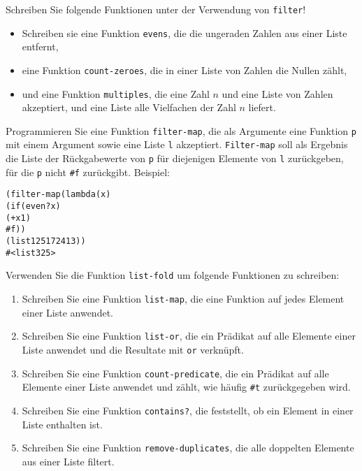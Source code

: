 \begin{aufgabe}
  Schreiben Sie folgende Funktionen unter der  
  Verwendung von \texttt{filter}!
  \begin{itemize}
    \item Schreiben sie eine Funktion \texttt{evens}, die die ungeraden Zahlen aus 
      einer Liste entfernt,
  \item eine Funktion \texttt{count-zeroes}, die in einer Liste von
    Zahlen die Nullen zählt,
  \item und eine Funktion \texttt{multiples}, die eine Zahl $n$ und
    eine Liste von Zahlen akzeptiert, und eine Liste alle Vielfachen
    der Zahl $n$ liefert.
  \end{itemize}
\end{aufgabe}

\begin{aufgabe}
  Programmieren Sie eine Funktion
  \texttt{filter-map}, die als Argumente eine Funktion \texttt{p} mit
  einem Argument sowie eine Liste \texttt{l} akzeptiert.
  \texttt{Filter-map} soll als Ergebnis die Liste der Rückgabewerte
  von \texttt{p} für diejenigen Elemente von \texttt{l} zurückgeben,
  für die \texttt{p} nicht \texttt{\#f} zurückgibt. Beispiel:

\begin{alltt}
(filter-map (lambda (x)
               (if (even? x)
                  (+ x 1)
                  #f))
            (list 1 2 5 17 24 13))
\evalsto{} #<list 3 25>
\end{alltt}
\end{aufgabe}

\begin{aufgabe}
  Verwenden Sie die Funktion \texttt{list-fold} um folgende 
  Funktionen zu schreiben:
  \begin{enumerate}
  \item Schreiben Sie eine Funktion \texttt{list-map}, die eine Funktion auf jedes
    Element einer Liste anwendet.
  \item Schreiben Sie eine Funktion \texttt{list-or}, die ein Prädikat auf alle
    Elemente einer Liste anwendet und die Resultate mit \texttt{or}
    verknüpft.
  \item Schreiben Sie eine Funktion \texttt{count-predicate}, die ein Prädikat auf
    alle Elemente einer Liste anwendet und zählt, wie häufig \verb|#t|
    zurückgegeben wird.
  \item Schreiben Sie eine Funktion \texttt{contains?}, die feststellt, ob ein
    Element in einer Liste enthalten ist.
  \item Schreiben Sie eine Funktion \texttt{remove-duplicates}, die alle doppelten
    Elemente aus einer Liste filtert.
  \end{enumerate}
\end{aufgabe}

